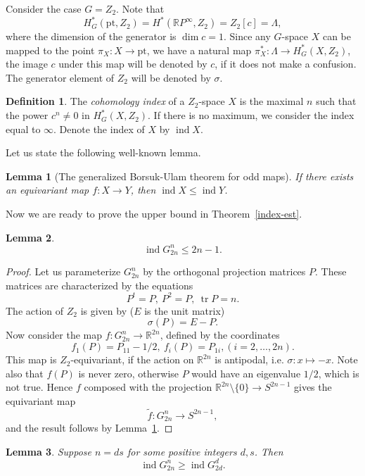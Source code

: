 \documentclass[12pt,a4paper]{amsart}
\newtheorem{lem}{Lemma}
\theoremstyle{definition}
\newtheorem{defn}{Definition}
\theoremstyle{remark}
\begin{document}
Consider the case $G=Z_2$. Note that 
$$
H_G^*(\mathrm{pt}, Z_2) = H^*(\mathbb RP^\infty, Z_2) = Z_2[c]=\Lambda,
$$ 
where the dimension of the generator is $\dim c = 1$. Since any $G$-space $X$ can be mapped to the point $\pi_X: X\to \mathrm{pt}$, we have a natural map $\pi_X^* : \Lambda\to H_G^*(X, Z_2)$, the image $c$ under this map will be denoted by $c$, if it does not make a confusion. The generator element of $Z_2$ will be denoted by $\sigma$.

\begin{defn}
The \emph{cohomology index} of a $Z_2$-space $X$ is the maximal $n$ such that the power $c^n\not=0$ in $H_G^*(X,Z_2)$. If there is no maximum, we consider the index equal to $\infty$. Denote the index of $X$ by $\operatorname{ind} X$.
\end{defn}

Let us state the following well-known lemma.

\begin{lem}[The generalized Borsuk-Ulam theorem for odd maps]
\label{index-bu}
If there exists an equivariant map $f: X\to Y$, then $\operatorname{ind} X\le \operatorname{ind} Y$.
\end{lem}

Now we are ready to prove the upper bound in Theorem~\ref{index-est}.

\begin{lem}
\label{index-est-up}
$$
\operatorname{ind} G_{2n}^n \le 2n-1.
$$
\end{lem}

\begin{proof}
Let us parameterize $G_{2n}^n$ by the orthogonal projection matrices $P$. These matrices are characterized by the equations
$$
P^t=P,\ P^2=P,\ \operatorname{tr} P = n.
$$
The action of $Z_2$ is given by ($E$ is the unit matrix)
$$
\sigma(P) = E-P.
$$
Now consider the map $f: G_{2n}^n\to \mathbb R^{2n}$, defined by the coordinates
$$
f_1(P) = P_{11}-1/2,\ f_i(P)=P_{1i}, (i=2,\ldots, 2n).
$$
This map is $Z_2$-equivariant, if the action on $\mathbb R^{2n}$ is antipodal, i.e. $\sigma: x\mapsto -x$. Note also that $f(P)$ is never zero, otherwise $P$ would have an eigenvalue $1/2$, which is not true. Hence $f$ composed with the projection $\mathbb R^{2n}\setminus\{0\}\to S^{2n-1}$ gives the equivariant map 
$$
\tilde f : G_{2n}^n\to S^{2n-1},
$$
and the result follows by Lemma~\ref{index-bu}.
\end{proof}

\begin{lem}
\label{index-div}
Suppose $n=ds$ for some positive integers $d,s$. Then
$$
\operatorname{ind} G_{2n}^n \ge \operatorname{ind} G_{2d}^d.
$$ 
\end{lem}
\end{document}
